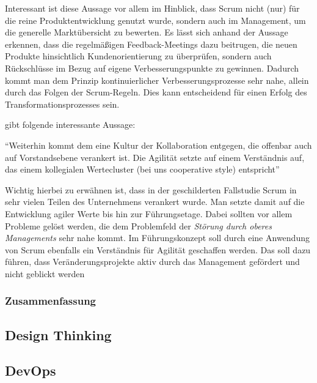 Interessant ist diese Aussage vor allem im Hinblick, dass Scrum nicht (nur) für die reine Produktentwicklung genutzt wurde, sondern auch im Management, um die generelle Marktübersicht zu bewerten. Es lässt sich anhand der Aussage erkennen, dass die regelmäßigen Feedback-Meetings dazu beitrugen, die neuen Produkte hinsichtlich Kundenorientierung zu überprüfen, sondern auch Rückschlüsse im Bezug auf eigene Verbesserungspunkte zu gewinnen. Dadurch kommt man dem Prinzip kontinuierlicher Verbesserungsprozesse sehr nahe, allein durch das Folgen der Scrum-Regeln. Dies kann entscheidend für einen Erfolg des Transformationsprozesses sein.

 gibt folgende interessante Aussage: 

\begin{center}
	``Weiterhin kommt dem eine Kultur der Kollaboration entgegen, die offenbar auch auf Vorstandsebene verankert ist. Die Agilität setzte auf einem Verständnis auf, das einem kollegialen Wertecluster (bei uns cooperative style) entspricht'' \cite[S. 210]{hofert_agile_2018}
\end{center}

Wichtig hierbei zu erwähnen ist, dass in der geschilderten Fallstudie Scrum in sehr vielen Teilen des Unternehmens verankert wurde. Man setzte damit auf die Entwicklung agiler Werte bis hin zur Führungsetage. Dabei sollten vor allem Probleme gelöst werden, die dem Problemfeld der \textit{Störung durch oberes Managements} sehr nahe kommt. Im Führungskonzept soll durch eine Anwendung von Scrum ebenfalls ein Verständnis für Agilität geschaffen werden. Das soll dazu führen, dass Veränderungsprojekte aktiv durch das Management gefördert und nicht geblickt werden

\todots

\subsubsection{Zusammenfassung}


\subsection{Design Thinking}

\todots

\subsection{DevOps}

